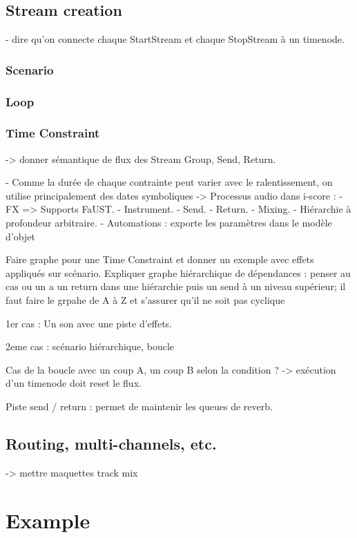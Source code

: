 \documentclass{article}
\begin{document}

\subsection{Stream creation}
- dire qu'on connecte chaque StartStream et chaque StopStream à un timenode.
\subsubsection{Scenario}
\subsubsection{Loop}
\subsubsection{Time Constraint}

-> donner sémantique de flux des Stream Group, Send, Return.

- Comme la durée de chaque contrainte peut varier avec le ralentissement, on utilise principalement 
des dates symboliques
-> Processus audio dans i-score : 
- FX => Supports FaUST.
- Instrument.
- Send.
- Return.
- Mixing.
- Hiérarchie à profondeur arbitraire.
- Automations : exporte les paramètres dans le modèle d'objet

Faire graphe pour une Time Constraint et donner un exemple avec effets appliqués sur scénario.
Expliquer graphe hiérarchique de dépendances : penser au cas ou un a un return dans une hiérarchie puis un send à un niveau supérieur; il faut faire le grpahe de A à Z et s'assurer qu'il ne soit pas cyclique

1er cas : 
Un son avec une piste d'effets.

2eme cas : scénario hiérarchique, boucle

Cas de la boucle avec un coup A, un coup B selon la condition ? 
-> exécution d'un timenode doit reset le flux.

Piste send / return : permet de maintenir les queues de reverb.


\subsection{Routing, multi-channels, etc.}
-> mettre maquettes track mix

\section{Example}
\end{document}
